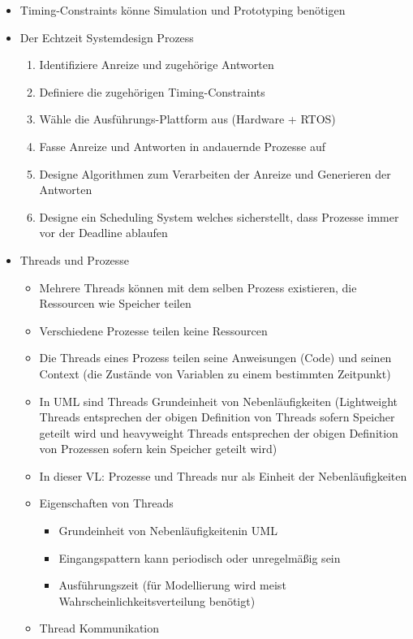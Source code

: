 \documentclass[paper=a4, fontsize=11pt]{scrartcl} %
\numberwithin{equation}{section} %
\numberwithin{figure}{section} %
\numberwithin{table}{section} %
\begin{document}
\begin{itemize}
\begin{itemize}
    \item Timing-Constraints könne Simulation und Prototyping benötigen
    \item Der Echtzeit Systemdesign Prozess
    \begin{enumerate}
      \item Identifiziere Anreize und zugehörige Antworten
      \item Definiere die zugehörigen Timing-Constraints
      \item Wähle die Ausführungs-Plattform aus (Hardware + RTOS)
      \item Fasse Anreize und Antworten in andauernde Prozesse auf
      \item Designe Algorithmen zum Verarbeiten der Anreize und Generieren der Antworten
      \item Designe ein Scheduling System welches sicherstellt, dass Prozesse immer vor der Deadline ablaufen
    \end{enumerate}
    \item Threads und Prozesse
    \begin{itemize}
      \item Mehrere Threads können mit dem selben Prozess existieren, die Ressourcen wie Speicher teilen
      \item Verschiedene Prozesse teilen keine Ressourcen
      \item Die Threads eines Prozess teilen seine Anweisungen (Code) und seinen Context (die Zustände von Variablen zu einem bestimmten Zeitpunkt)
      \item In UML sind Threads Grundeinheit von Nebenläufigkeiten (Lightweight Threads entsprechen der obigen Definition von Threads sofern Speicher geteilt wird und heavyweight Threads entsprechen der obigen Definition von Prozessen sofern kein Speicher geteilt wird)
      \item In dieser VL: Prozesse und Threads nur als Einheit der Nebenläufigkeiten
      \item Eigenschaften von Threads
      \begin{itemize}
        \item Grundeinheit von Nebenläufigkeitenin UML
        \item Eingangspattern kann periodisch oder unregelmäßig sein
        \item Ausführungszeit (für Modellierung wird meist Wahrscheinlichkeitsverteilung benötigt)
      \end{itemize}
      \item Thread Kommunikation

\end{itemize}
\end{itemize}
\end{itemize}
\end{document}
